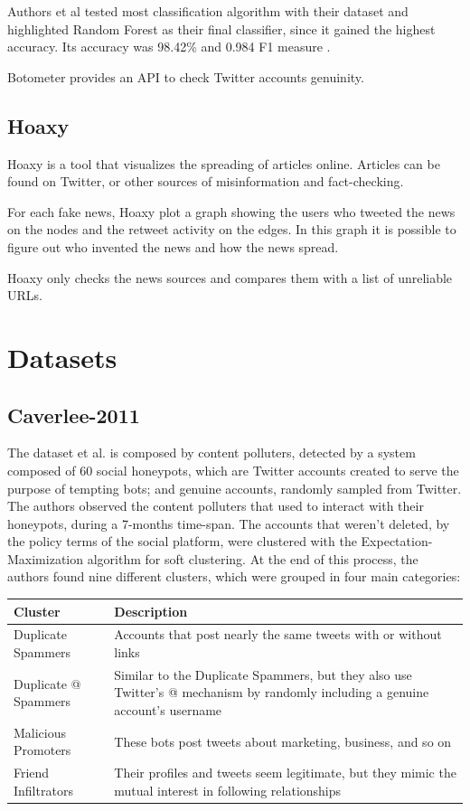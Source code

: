 Authors et al \cite{Botometer} tested most classification algorithm with their dataset and highlighted Random Forest as their final classifier, since it gained the highest accuracy. Its accuracy was 98.42\% and 0.984 F1 measure \cite{Lee11sevenmonths}.

Botometer provides an API to check Twitter accounts genuinity.

\subsection{Hoaxy}
Hoaxy is a tool that visualizes the spreading of articles online. Articles can be found on Twitter, or other sources of misinformation and fact-checking.

For each fake news, Hoaxy plot a graph showing the users who tweeted the news on the nodes and the retweet activity on the edges. In this graph it is possible to figure out who invented the news and how the news spread.

Hoaxy only checks the news sources and compares them with a list of unreliable URLs.

\section{Datasets}

\subsection{Caverlee-2011}
The dataset et al. \cite{Lee11sevenmonths} is composed by content polluters, detected by a system composed of 60 social honeypots, which are Twitter accounts created to serve the purpose of tempting bots; and genuine accounts, randomly sampled from Twitter.
The authors observed the content polluters that used to interact with their honeypots, during a 7-months time-span. The accounts that weren't deleted, by the policy terms of the social platform, were clustered with the Expectation-Maximization algorithm for soft clustering. At the end of this process, the authors found nine different clusters, which were grouped in four main categories:

\begin{center}
	\begin{tabular}{>{\raggedright\arraybackslash}m{5.5cm}|>{\raggedright\arraybackslash}m{5.5cm}}
		\\Cluster&Description\\
		\hline\hline
		Duplicate Spammers & Accounts that post nearly the same tweets with or without links\\\hline
		Duplicate @ Spammers & Similar to the Duplicate Spammers, but they also use Twitter’s @ mechanism by randomly including a genuine account’s username\\\hline
		Malicious Promoters & These bots post tweets about marketing, business, and so on\\\hline
		Friend Infiltrators & Their profiles and tweets seem legitimate, but they mimic the mutual interest in following relationships\\\hline
	\end{tabular}
\end{center}

